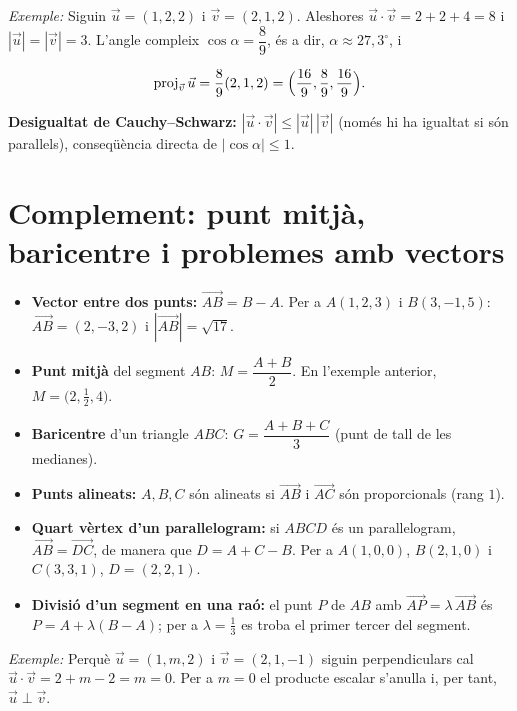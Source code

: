 \emph{Exemple:} Siguin $\vec u=(1,2,2)$ i $\vec v=(2,1,2)$. Aleshores $\vec u\cdot\vec v=2+2+4=8$ i $|\vec u|=|\vec v|=3$. L'angle compleix $\cos\alpha=\dfrac{8}{9}$, és a dir, $\alpha\approx27{,}3^{\circ}$, i

\begin{equation*}
\operatorname{proj}_{\vec v}\vec u=\frac{8}{9}(2,1,2)=\Bigl(\frac{16}{9},\frac89,\frac{16}{9}\Bigr).
\end{equation*}

\textbf{Desigualtat de Cauchy--Schwarz:} $|\vec u\cdot\vec v|\le|\vec u|\,|\vec v|$ (només hi ha igualtat si són paral\textperiodcentered{}lels), conseqüència directa de $|\cos\alpha|\le1$.

\section{Complement: punt mitjà, baricentre i problemes amb vectors}

\begin{itemize}
\item \textbf{Vector entre dos punts:} $\overrightarrow{AB}=B-A$. Per a $A(1,2,3)$ i $B(3,-1,5)$: $\overrightarrow{AB}=(2,-3,2)$ i $|\overrightarrow{AB}|=\sqrt{17}$.
\item \textbf{Punt mitjà} del segment $AB$: $M=\dfrac{A+B}{2}$. En l'exemple anterior, $M=\bigl(2,\tfrac12,4\bigr)$.
\item \textbf{Baricentre} d'un triangle $ABC$: $G=\dfrac{A+B+C}{3}$ (punt de tall de les medianes).
\item \textbf{Punts alineats:} $A,B,C$ són alineats si $\overrightarrow{AB}$ i $\overrightarrow{AC}$ són proporcionals (rang $1$).
\item \textbf{Quart vèrtex d'un paral\textperiodcentered{}lelogram:} si $ABCD$ és un paral\textperiodcentered{}lelogram, $\overrightarrow{AB}=\overrightarrow{DC}$, de manera que $D=A+C-B$. Per a $A(1,0,0)$, $B(2,1,0)$ i $C(3,3,1)$, $D=(2,2,1)$.
\item \textbf{Divisió d'un segment en una raó:} el punt $P$ de $AB$ amb $\overrightarrow{AP}=\lambda\,\overrightarrow{AB}$ és $P=A+\lambda(B-A)$; per a $\lambda=\tfrac13$ es troba el primer tercer del segment.
\end{itemize}

\emph{Exemple:} Perquè $\vec u=(1,m,2)$ i $\vec v=(2,1,-1)$ siguin perpendiculars cal $\vec u\cdot\vec v=2+m-2=m=0$. Per a $m=0$ el producte escalar s'anul\textperiodcentered{}la i, per tant, $\vec u\perp\vec v$.
